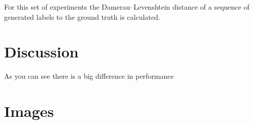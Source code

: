For this set of experiments the Damerau–Levenshtein distance of a sequence of generated labels to the ground truth is calculated.


\section{Discussion}
As you can see there is a big difference in performance



\section{Images}

\renewcommand{\thesubfigure}{\thefigure.\roman{subfigure}}
\begin{figure}[htbp]
\begin{center}
\hspace{0.03\linewidth}
\hspace{0.03\linewidth}
\hspace{0.03\linewidth}
\hspace{0.03\linewidth}

\end{center}
\end{figure}
